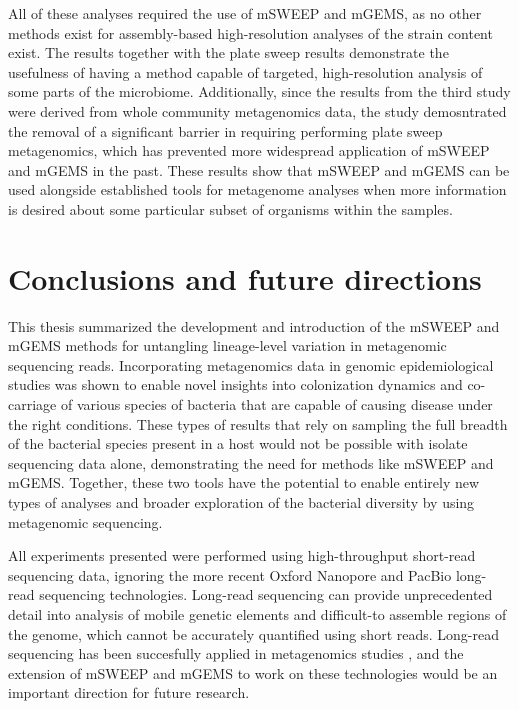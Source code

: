 \documentclass[officiallayout]{tktla}
\begin{document}
All of these analyses required the use of mSWEEP and mGEMS, as no
other methods exist for assembly-based high-resolution analyses of the
strain content exist. The results together with the plate sweep
results demonstrate the usefulness of having a method capable of
targeted, high-resolution analysis of some parts of the
microbiome. Additionally, since the results from the third study were
derived from whole community metagenomics data, the study demosntrated the removal
of a significant barrier in requiring performing plate sweep
metagenomics, which has prevented more widespread application of
mSWEEP and mGEMS in the past. These results show that mSWEEP and mGEMS
can be used alongside established tools for metagenome analyses when more
information is desired about some particular subset of organisms
within the samples.

\chapter{Conclusions and future directions}
\label{conclusions-and-future-directions}

This thesis summarized the development and introduction of the mSWEEP
and mGEMS methods for untangling lineage-level variation in metagenomic
sequencing reads. Incorporating metagenomics data in genomic
epidemiological studies was shown to enable novel insights into
colonization dynamics and co-carriage of various species of bacteria
that are capable of causing disease under the right conditions. These
types of results that rely on sampling the full breadth of the
bacterial species present in a host would not be possible with isolate
sequencing data alone, demonstrating the need for methods like mSWEEP
and mGEMS. Together, these two tools have the potential to enable
entirely new types of analyses and broader exploration of the
bacterial diversity by using metagenomic sequencing.

All experiments presented were performed using high-throughput
short-read sequencing data, ignoring the more recent Oxford Nanopore
and PacBio long-read sequencing technologies. Long-read sequencing can
provide unprecedented detail into analysis of mobile genetic elements
and difficult-to assemble regions of the genome, which cannot be
accurately quantified using short reads. Long-read sequencing has been
succesfully applied in metagenomics studies \citep{somerville2019long,
  stewart2019compendium}, and the extension of mSWEEP and mGEMS to
work on these technologies would be an important direction for future
research.
\end{document}
